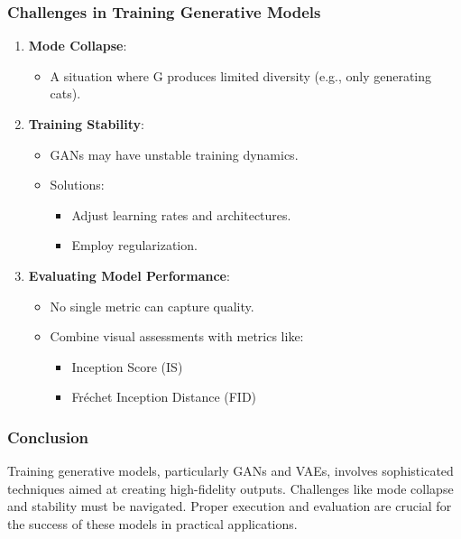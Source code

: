 \documentclass[aspectratio=169]{beamer}
\begin{document}
\begin{frame}[fragile]
    \frametitle{Challenges in Training Generative Models}
    \begin{enumerate}
        \item \textbf{Mode Collapse}:
            \begin{itemize}
                \item A situation where G produces limited diversity (e.g., only generating cats).
            \end{itemize}
            
        \item \textbf{Training Stability}:
            \begin{itemize}
                \item GANs may have unstable training dynamics.
                \item Solutions:
                    \begin{itemize}
                        \item Adjust learning rates and architectures.
                        \item Employ regularization.
                    \end{itemize}
            \end{itemize}
        
        \item \textbf{Evaluating Model Performance}:
            \begin{itemize}
                \item No single metric can capture quality.
                \item Combine visual assessments with metrics like:
                    \begin{itemize}
                        \item Inception Score (IS)
                        \item Fréchet Inception Distance (FID)
                    \end{itemize}
            \end{itemize}
    \end{enumerate}
\end{frame}

\begin{frame}[fragile]
    \frametitle{Conclusion}
    Training generative models, particularly GANs and VAEs, involves sophisticated techniques aimed at creating high-fidelity outputs. Challenges like mode collapse and stability must be navigated. Proper execution and evaluation are crucial for the success of these models in practical applications.
\end{frame}
\end{document}
